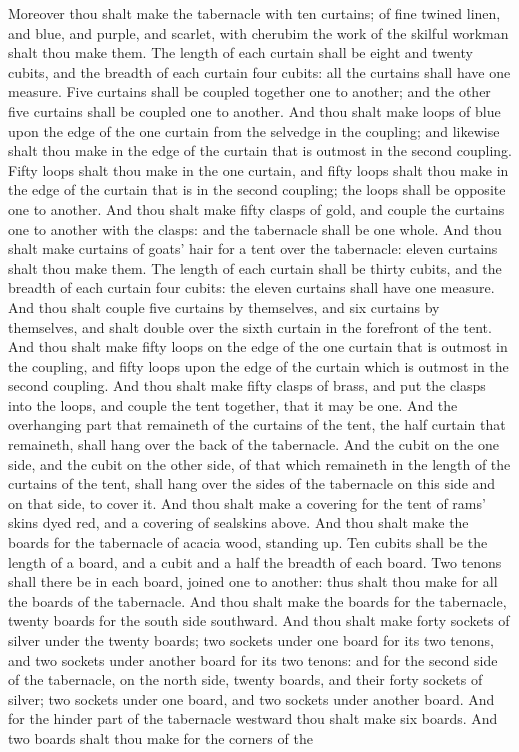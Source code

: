 Moreover thou shalt make the tabernacle with ten curtains; of fine twined linen, and blue, and purple, and scarlet, with cherubim the work of the skilful workman shalt thou make them. The length of each curtain shall be eight and twenty cubits, and the breadth of each curtain four cubits: all the curtains shall have one measure. Five curtains shall be coupled together one to another; and the other five curtains shall be coupled one to another. And thou shalt make loops of blue upon the edge of the one curtain from the selvedge in the coupling; and likewise shalt thou make in the edge of the curtain that is outmost in the second coupling. Fifty loops shalt thou make in the one curtain, and fifty loops shalt thou make in the edge of the curtain that is in the second coupling; the loops shall be opposite one to another. And thou shalt make fifty clasps of gold, and couple the curtains one to another with the clasps: and the tabernacle shall be one whole.  And thou shalt make curtains of goats’ hair for a tent over the tabernacle: eleven curtains shalt thou make them. The length of each curtain shall be thirty cubits, and the breadth of each curtain four cubits: the eleven curtains shall have one measure. And thou shalt couple five curtains by themselves, and six curtains by themselves, and shalt double over the sixth curtain in the forefront of the tent. And thou shalt make fifty loops on the edge of the one curtain that is outmost in the coupling, and fifty loops upon the edge of the curtain which is outmost in the second coupling. And thou shalt make fifty clasps of brass, and put the clasps into the loops, and couple the tent together, that it may be one. And the overhanging part that remaineth of the curtains of the tent, the half curtain that remaineth, shall hang over the back of the tabernacle. And the cubit on the one side, and the cubit on the other side, of that which remaineth in the length of the curtains of the tent, shall hang over the sides of the tabernacle on this side and on that side, to cover it. And thou shalt make a covering for the tent of rams’ skins dyed red, and a covering of sealskins above.  And thou shalt make the boards for the tabernacle of acacia wood, standing up. Ten cubits shall be the length of a board, and a cubit and a half the breadth of each board. Two tenons shall there be in each board, joined one to another: thus shalt thou make for all the boards of the tabernacle. And thou shalt make the boards for the tabernacle, twenty boards for the south side southward. And thou shalt make forty sockets of silver under the twenty boards; two sockets under one board for its two tenons, and two sockets under another board for its two tenons: and for the second side of the tabernacle, on the north side, twenty boards, and their forty sockets of silver; two sockets under one board, and two sockets under another board. And for the hinder part of the tabernacle westward thou shalt make six boards. And two boards shalt thou make for the corners of the 